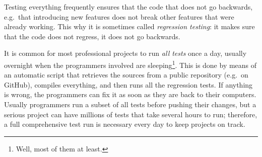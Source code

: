 Testing everything frequently ensures that the code that does not go
backwards, e.g.~that introducing new features does not break other
features that were already working. This why it is sometimes called
\emph{regression testing}: it makes sure that the code does not
regress, it does not go backwards. 

It is common for most professional projects to run \emph{all tests}
once a day, usually overnight when the programmers involved are
sleeping\footnote{Well, most of them at least.}. This is done by means
of an automatic script that retrieves the sources from a public
repository (e.g.~on GitHub), compiles everything, and then runs all
the regression tests. If anything is wrong, the programmers can fix it
as soon as they are back to their computers. Usually programmers run
a subset of all tests before pushing their changes, but a serious
project can have millions of tests that take several hours to run;
therefore, a full comprehensive test run is necessary every day to
keep projects on track. 



